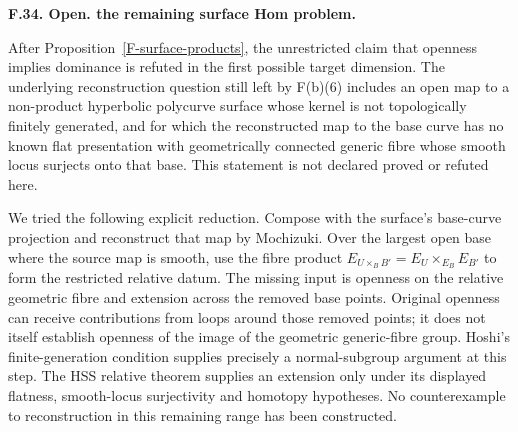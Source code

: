 \documentclass[11pt,oneside]{article}
\makeatletter
\newcounter{statementanchor}
\newenvironment{statement}[3]{%
 \refstepcounter{statementanchor}\def\@currentlabel{#1}%
 \par\addvspace{9pt}\noindent
 \textbf{#1. #2. #3.}\par\nobreak\noindent\ignorespaces
}{\par\addvspace{5pt}}
\makeatother
\begin{document}
\begin{statement}{F.34}{Open}{the remaining surface Hom problem}
\label{st:F.34}
\label{F-surface-open}
After Proposition~\ref{F-surface-products}, the unrestricted
claim that openness implies dominance is refuted in the first
possible target dimension. The underlying reconstruction
question still left by F(b)(6) includes an open map to a
non-product hyperbolic polycurve surface whose kernel is not
topologically finitely generated, and for which the reconstructed
map to the base curve has no known flat presentation with
geometrically connected generic fibre whose smooth locus
surjects onto that base. This statement is
not declared proved or refuted here.

We tried the following explicit reduction. Compose with the
surface's base-curve projection and reconstruct that map by
Mochizuki. Over the largest open base where the source map is
smooth, use the fibre product
$E_{U\times_B B'}=E_U\times_{E_B}E_{B'}$ to form the
restricted relative datum. The missing input is openness on the
relative geometric fibre and extension across the removed base
points. Original openness can receive contributions from loops
around those removed points; it does not itself establish
openness of the image of the geometric generic-fibre group.
Hoshi's finite-generation condition supplies precisely a
normal-subgroup argument at this step. The HSS relative theorem
supplies an extension only under its displayed flatness,
smooth-locus surjectivity and homotopy hypotheses. No counterexample to
reconstruction in this remaining range has been constructed.
\end{statement}
\end{document}
